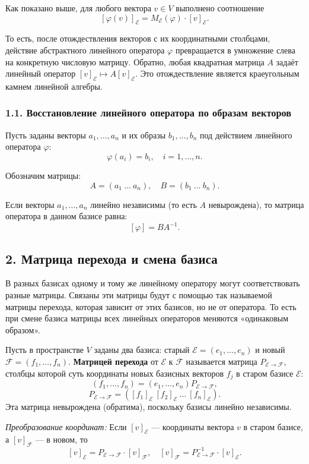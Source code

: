 Как показано выше, для любого вектора $v \in V$ выполнено соотношение
\[
[\varphi(v)]_\mathcal{E} = M_\mathcal{E}(\varphi) \cdot [v]_\mathcal{E}.
\]

То есть, после отождествления векторов с их координатными столбцами, действие абстрактного линейного оператора $\varphi$ превращается в умножение слева на конкретную числовую матрицу. Обратно, любая квадратная матрица $A$ задаёт линейный оператор $[v]_\mathcal{E} \mapsto A[v]_\mathcal{E}$. Это отождествление является краеугольным камнем линейной алгебры.

\subsubsection*{1.1. Восстановление линейного оператора по образам векторов}

Пусть заданы векторы $a_1,\dots,a_n$ и их образы $b_1,\dots,b_n$ под действием линейного оператора $\varphi$:
\[
\varphi(a_i)=b_i,\quad i=1,\dots,n.
\]

Обозначим матрицы:
\[
A = (a_1 \ \dots \ a_n), \quad B = (b_1 \ \dots \ b_n).
\]

Если векторы $a_1,\dots,a_n$ линейно независимы (то есть $A$ невырождена), то матрица оператора в данном базисе равна:
\[
[\varphi] = B A^{-1}.
\]

\subsection*{2. Матрица перехода и смена базиса}

В разных базисах одному и тому же линейному оператору могут соответствовать разные матрицы. Связаны эти матрицы будут с помощью так называемой матрицы перехода, которая зависит от этих базисов, но не от оператора. То есть при смене базиса матрицы всех линейных операторов меняются «одинаковым образом».

Пусть в пространстве $V$ заданы два базиса: старый $\mathcal{E} = (e_1, \dots, e_n)$ и новый $\mathcal{F} = (f_1, \dots, f_n)$. \textbf{Матрицей перехода} от $\mathcal{E}$ к $\mathcal{F}$ называется матрица $P_{\mathcal{E} \to \mathcal{F}}$, столбцы которой суть координаты новых базисных векторов $f_j$ в старом базисе $\mathcal{E}$:
\[
(f_1, \dots, f_n) = (e_1, \dots, e_n)P_{\mathcal{E} \to \mathcal{F}},
\]
\[
P_{\mathcal{E} \to \mathcal{F}} = ([f_1]_\mathcal{E}\ [f_2]_\mathcal{E}\ \dots\ [f_n]_\mathcal{E}).
\]
Эта матрица невырождена (обратима), поскольку базисы линейно независимы.

\textit{Преобразование координат:} Если $[v]_\mathcal{E}$ — координаты вектора $v$ в старом базисе, а $[v]_\mathcal{F}$ — в новом, то
\[
[v]_\mathcal{E} = P_{\mathcal{E} \to \mathcal{F}} \cdot [v]_\mathcal{F}, \quad [v]_\mathcal{F} = P_{\mathcal{E} \to \mathcal{F}}^{-1} \cdot [v]_\mathcal{E}.
\]

